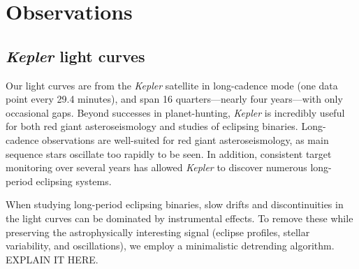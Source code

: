 \section{Observations}\label{data}

\subsection{\emph{Kepler} light curves}\label{kepler}
Our light curves are from the \emph{Kepler} satellite in long-cadence mode (one data point every 29.4 minutes), and span 16 quarters---nearly four years---with only occasional gaps. Beyond successes in planet-hunting, \emph{Kepler} is incredibly useful for both red giant asteroseismology and studies of eclipsing binaries. Long-cadence observations are well-suited for red giant asteroseismology, as main sequence stars oscillate too rapidly to be seen. In addition, consistent target monitoring over several years has allowed \emph{Kepler} to discover numerous long-period eclipsing systems.

When studying long-period eclipsing binaries, slow drifts and discontinuities in the light curves can be dominated by instrumental effects. To remove these while preserving the astrophysically interesting signal (eclipse profiles, stellar variability, and oscillations), we employ a minimalistic detrending algorithm. EXPLAIN IT HERE.




